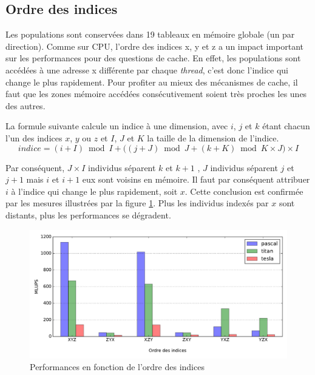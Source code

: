 \subsection{Ordre des indices}

Les populations sont conservées dans 19 tableaux en mémoire globale (un par direction). Comme sur \acs{CPU}, l'ordre des indices x, y et z a un impact important sur les performances pour des questions de cache. En effet, les populations sont accédées à une adresse x différente par chaque \textit{thread}, c'est donc l'indice qui change le plus rapidement. Pour profiter au mieux des mécanismes de cache, il faut que les zones mémoire accédées consécutivement soient très proches les unes des autres.

La formule suivante calcule un indice à une dimension, avec $i$, $j$ et $k$ étant chacun l'un des indices $x$, $y$ ou $z$ et $I$, $J$ et $K$ la taille de la dimension de l'indice.
\begin{equation}
indice = (i+I) \bmod I + \Big((j+J) \bmod J + ( k+K) \bmod K \times J\Big) \times I
\end{equation}

Par conséquent, $J \times I$ individus séparent $k$ et $k+1$ , $J$ individus séparent $j$ et $j+1$ mais $i$ et $i+1$ eux sont voisins en mémoire. Il faut par conséquent attribuer $i$ à l'indice qui change le plus rapidement, soit $x$. Cette conclusion est confirmée par les mesures illustrées par la figure \ref{fig:index_order}. Plus les individus indexés par $x$ sont distants, plus les performances se dégradent.
 
\begin{figure}[H]
	\centering
	\includegraphics[fbox, scale=0.61]{images/perfs/lbm_simple_lbmcuda/index_order.pdf}
	\caption{Performances en fonction de l'ordre des indices}
	\label{fig:index_order}
\end{figure}

